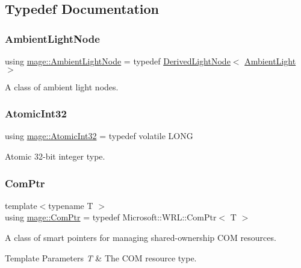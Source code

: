 \subsection{Typedef Documentation}
\hypertarget{namespacemage_ab0783a7428706251f8561dc30a4d228d}{}\label{namespacemage_ab0783a7428706251f8561dc30a4d228d} 
\subsubsection{\texorpdfstring{Ambient\+Light\+Node}{AmbientLightNode}}
{\footnotesize\ttfamily using \hyperlink{namespacemage_ab0783a7428706251f8561dc30a4d228d}{mage\+::\+Ambient\+Light\+Node} = typedef \hyperlink{classmage_1_1_derived_light_node}{Derived\+Light\+Node}$<$ \hyperlink{classmage_1_1_ambient_light}{Ambient\+Light} $>$}

A class of ambient light nodes. \hypertarget{namespacemage_a37ac3b8da2d89495d105e00f1022cb1e}{}\label{namespacemage_a37ac3b8da2d89495d105e00f1022cb1e} 
\subsubsection{\texorpdfstring{Atomic\+Int32}{AtomicInt32}}
{\footnotesize\ttfamily using \hyperlink{namespacemage_a37ac3b8da2d89495d105e00f1022cb1e}{mage\+::\+Atomic\+Int32} = typedef volatile L\+O\+NG}

Atomic 32-\/bit integer type. \hypertarget{namespacemage_ae74f374780900893caa5555d1031fd79}{}\label{namespacemage_ae74f374780900893caa5555d1031fd79} 
\subsubsection{\texorpdfstring{Com\+Ptr}{ComPtr}}
{\footnotesize\ttfamily template$<$typename T $>$ \\
using \hyperlink{namespacemage_ae74f374780900893caa5555d1031fd79}{mage\+::\+Com\+Ptr} = typedef Microsoft\+::\+W\+R\+L\+::\+Com\+Ptr$<$ T $>$}

A class of smart pointers for managing shared-\/ownership C\+OM resources.


\begin{DoxyTemplParams}{Template Parameters}
{\em T} & The C\+OM resource type. \\
\hline
\end{DoxyTemplParams}
\hypertarget{namespacemage_a7637b5351fc0f66a10badd80ebb35899}{}\label{namespacemage_a7637b5351fc0f66a10badd80ebb35899} 
